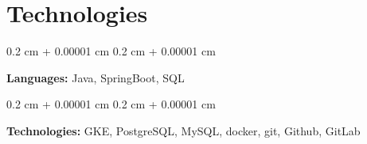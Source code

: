 \documentclass[10pt, letterpaper]{article}
\newenvironment{onecolentry}{
    \begin{adjustwidth}{
        0.2 cm + 0.00001 cm
    }{
        0.2 cm + 0.00001 cm
    }
}{
    \end{adjustwidth}
} %
\begin{document}
    
    \section{Technologies}



        
        \begin{onecolentry}
            \textbf{Languages:} Java, SpringBoot, SQL
        \end{onecolentry}

        \vspace{0.2 cm}

        \begin{onecolentry}
            \textbf{Technologies:} GKE, PostgreSQL, MySQL, docker, git, Github, GitLab
        \end{onecolentry}


    
\end{document}
